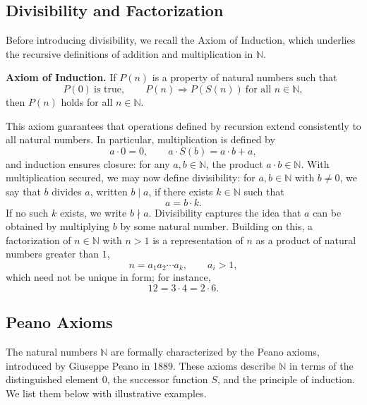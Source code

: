 \documentclass[10pt]{article}
\begin{document}
\subsection*{Divisibility and Factorization}

Before introducing divisibility, we recall the Axiom of Induction, which underlies the recursive definitions of addition and multiplication in $\mathbb{N}$. 

\textbf{Axiom of Induction.} If $P(n)$ is a property of natural numbers such that 
$$P(0) \ \text{is true}, \qquad P(n) \Rightarrow P(S(n)) \ \text{for all } n \in \mathbb{N},$$ 
then $P(n)$ holds for all $n \in \mathbb{N}.$

This axiom guarantees that operations defined by recursion extend consistently to all natural numbers. In particular, multiplication is defined by 
$$a \cdot 0 = 0, \qquad a \cdot S(b) = a \cdot b + a,$$ 
and induction ensures closure: for any $a,b \in \mathbb{N}$, the product $a \cdot b \in \mathbb{N}.$ With multiplication secured, we may now define divisibility: for $a,b \in \mathbb{N}$ with $b \neq 0$, we say that $b$ divides $a$, written $b \mid a$, if there exists $k \in \mathbb{N}$ such that 
$$a = b \cdot k.$$ 
If no such $k$ exists, we write $b \nmid a$. Divisibility captures the idea that $a$ can be obtained by multiplying $b$ by some natural number. Building on this, a factorization of $n \in \mathbb{N}$ with $n > 1$ is a representation of $n$ as a product of natural numbers greater than $1$, 
$$n = a_1 a_2 \cdots a_k, \qquad a_i > 1,$$ 
which need not be unique in form; for instance, 
$$12 = 3 \cdot 4 = 2 \cdot 6.$$

\subsection*{Peano Axioms}

The natural numbers $\mathbb{N}$ are formally characterized by the Peano axioms, introduced by Giuseppe Peano in 1889. These axioms describe $\mathbb{N}$ in terms of the distinguished element $0$, the successor function $S$, and the principle of induction. We list them below with illustrative examples.
\end{document}

